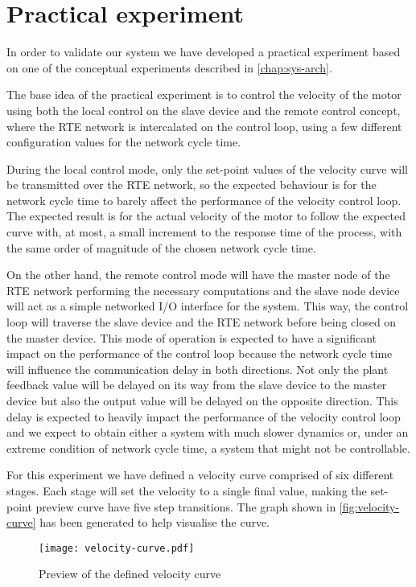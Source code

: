 \section{Practical experiment}
In order to validate our system we have developed a practical experiment based on one of the conceptual experiments described in \autoref{chap:sys-arch}.

The base idea of the practical experiment is to control the velocity of the motor using both the local control on the slave device and the remote control concept, where the RTE network is intercalated on the control loop, using a few different configuration values for the network cycle time.

During the local control mode, only the set-point values of the velocity curve will be transmitted over the RTE network, so the expected behaviour is for the network cycle time to barely affect the performance of the velocity control loop.
The expected result is for the actual velocity of the motor to follow the expected curve with, at most, a small increment to the response time of the process, with the same order of magnitude of the chosen network cycle time.

On the other hand, the remote control mode will have the master node of the RTE network performing the necessary computations and the slave node device will act as a simple networked I/O interface for the system.
This way, the control loop will traverse the slave device and the RTE network before being closed on the master device.
This mode of operation is expected to have a significant impact on the performance of the control loop because the network cycle time will influence the communication delay in both directions.
Not only the plant feedback value will be delayed on its way from the slave device to the master device but also the output value will be delayed on the opposite direction.
This delay is expected to heavily impact the performance of the velocity control loop and we expect to obtain either a system with much slower dynamics or, under an extreme condition of network cycle time, a system that might not be controllable.

For this experiment we have defined a velocity curve comprised of six different stages.
Each stage will set the velocity to a single final value, making the set-point preview curve have five step transitions.
The graph shown in \autoref{fig:velocity-curve} has been generated to help visualise the curve.

\begin{figure}[htp]
	\centering
	\texttt{[image: velocity-curve.pdf]}
	\caption{Preview of the defined velocity curve}
	\label{fig:velocity-curve}
\end{figure}

